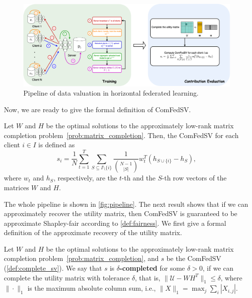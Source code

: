 \begin{figure}[t]
    \centering
    \includegraphics[width=\textwidth]{./figures/DataValuation.drawio.png}
    \caption{Pipeline of data valuation in horizontal federated learning.}
    \label{fig:pipeline}
\end{figure}

Now, we are ready to give the formal definition of ComFedSV. 
\begin{definition} \label{def:complete_sv}
    Let $W$ and  $H$ be the optimal solutions to the approximately low-rank matrix completion problem~\eqref{prob:matrix_completion}. Then, the ComFedSV for each client $i \in I$ is defined as 
    \begin{equation} \label{eq:complete_sv}
        s_i = \frac{1}{N} \sum_{t=1}^T\sum\limits_{S \subseteq I \setminus\{i\}} \frac{1}{\binom{N-1}{|S|}} w_t^T(h_{S\cup\{i\}} - h_S),
    \end{equation}
    where $w_t$ and $h_S$, respectively, are the $t$-th and the $S$-th row vectors of the matrices $W$ and $H$.
\end{definition}
The whole pipeline is shown in \autoref{fig:pipeline}. The next result shows that if we can approximately recover the utility matrix, then ComFedSV is guaranteed to be approximate Shapley-fair according to \autoref{def:fairness}. We first give a formal definition of the approximate recovery of the utility matrix. 

\begin{definition} \label{def:completeness}
    Let $W$ and  $H$ be the optimal solutions to the approximately low-rank matrix completion problem~\eqref{prob:matrix_completion}, and $s$ be the ComFedSV (\autoref{def:complete_sv}). We say that $s$ is \textbf{$\delta$-completed} for some $\delta>0$, if we can complete the utility matrix with tolerance $\delta$, that is,
    $\|\mathcal{U} - W H^T\|_1 \leq \delta$, where
    $\|\cdot\|_1$ is the maximum absolute column sum, i.e., $\|X\|_1 = \max_j \sum_i |X_{i,j}|$. 
\end{definition}

